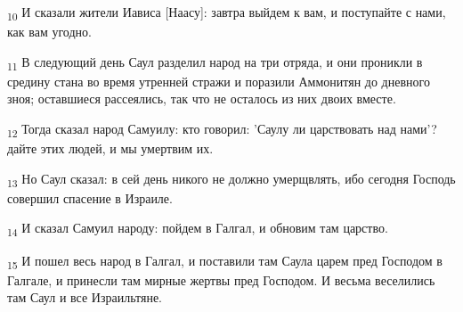 \begin{tcolorbox}
\textsubscript{10} И сказали жители Иависа [Наасу]: завтра выйдем к вам, и поступайте с нами, как вам угодно.
\end{tcolorbox}
\begin{tcolorbox}
\textsubscript{11} В следующий день Саул разделил народ на три отряда, и они проникли в средину стана во время утренней стражи и поразили Аммонитян до дневного зноя; оставшиеся рассеялись, так что не осталось из них двоих вместе.
\end{tcolorbox}
\begin{tcolorbox}
\textsubscript{12} Тогда сказал народ Самуилу: кто говорил: 'Саулу ли царствовать над нами'? дайте этих людей, и мы умертвим их.
\end{tcolorbox}
\begin{tcolorbox}
\textsubscript{13} Но Саул сказал: в сей день никого не должно умерщвлять, ибо сегодня Господь совершил спасение в Израиле.
\end{tcolorbox}
\begin{tcolorbox}
\textsubscript{14} И сказал Самуил народу: пойдем в Галгал, и обновим там царство.
\end{tcolorbox}
\begin{tcolorbox}
\textsubscript{15} И пошел весь народ в Галгал, и поставили там Саула царем пред Господом в Галгале, и принесли там мирные жертвы пред Господом. И весьма веселились там Саул и все Израильтяне.
\end{tcolorbox}
